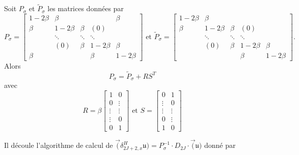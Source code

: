 \begin{proposition}
Soit $P_{\sigma}$ et $\tilde{P}_{\sigma}$ les matrices données par 
\begin{equation}
P_{\sigma} = \begin{bmatrix}
  1 - 2 \beta & \beta &   &   & \beta \\ 
  \beta & 1 - 2 \beta & \beta & (0) &   \\ 
    & \ddots & \ddots & \ddots &   \\ 
    & (0) & \beta & 1 - 2 \beta & \beta \\ 
  \beta &   &   & \beta & 1 - 2 \beta
  \end{bmatrix}  \text{ et }
\tilde{P}_{\sigma} = 
\begin{bmatrix}
  1 - 2 \beta & \beta &   &   &  \\ 
  \beta & 1 - 2 \beta & \beta & (0) &   \\ 
    & \ddots & \ddots & \ddots &   \\ 
    & (0) & \beta & 1 - 2 \beta & \beta \\ 
   &   &   & \beta & 1 - 2 \beta
  \end{bmatrix} .
\end{equation}
Alors 
\begin{equation}
P_{\sigma} = \tilde{P}_{\sigma} + R S^T
\end{equation} 
avec 
\begin{equation}
R = \beta \begin{bmatrix}
1 & 0 \\ 
0 & \vdots \\ 
\vdots & \vdots \\ 
\vdots & 0 \\ 
0 & 1
\end{bmatrix} \text{ et } 
S = \begin{bmatrix}
0 & 1 \\ 
\vdots & 0 \\ 
\vdots & \vdots \\ 
0 & \vdots \\ 
1 & 0
\end{bmatrix} 
\end{equation}
\end{proposition}

Il découle l'algorithme de calcul de $\vec (\delta_{2J+2,x}^H \mathfrak{u}) = P^{-1}_{\sigma} \cdot D_{2J} \cdot \vec (\mathfrak{u})$ donné par


